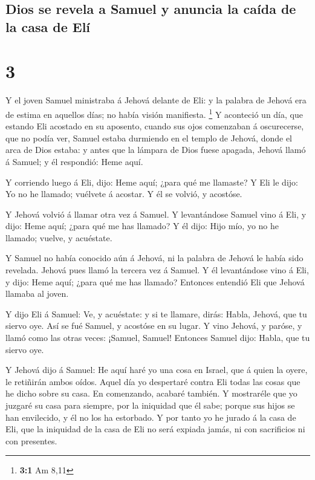 \hypertarget{dios-se-revela-a-samuel-y-anuncia-la-cauxedda-de-la-casa-de-eluxed}{%
\subsection{Dios se revela a Samuel y anuncia la caída de la casa de
Elí}\label{dios-se-revela-a-samuel-y-anuncia-la-cauxedda-de-la-casa-de-eluxed}}

\hypertarget{section-2}{%
\section{3}\label{section-2}}

 Y el joven Samuel ministraba á Jehová delante de Eli: y la
palabra de Jehová era de estima en aquellos días; no había visión
manifiesta. \footnote{\textbf{3:1} Am 8,11}  Y aconteció un
día, que estando Eli acostado en su aposento, cuando sus ojos comenzaban
á oscurecerse, que no podía ver,  Samuel estaba durmiendo en
el templo de Jehová, donde el arca de Dios estaba: y antes que la
lámpara de Dios fuese apagada,  Jehová llamó á Samuel; y él
respondió: Heme aquí.

 Y corriendo luego á Eli, dijo: Heme aquí; ¿para qué me
llamaste? Y Eli le dijo: Yo no he llamado; vuélvete á acostar. Y él se
volvió, y acostóse.

 Y Jehová volvió á llamar otra vez á Samuel. Y levantándose
Samuel vino á Eli, y dijo: Heme aquí; ¿para qué me has llamado? Y él
dijo: Hijo mío, yo no he llamado; vuelve, y acuéstate.

 Y Samuel no había conocido aún á Jehová, ni la palabra de
Jehová le había sido revelada.  Jehová pues llamó la tercera
vez á Samuel. Y él levantándose vino á Eli, y dijo: Heme aquí; ¿para qué
me has llamado? Entonces entendió Eli que Jehová llamaba al joven.

 Y dijo Eli á Samuel: Ve, y acuéstate: y si te llamare,
dirás: Habla, Jehová, que tu siervo oye. Así se fué Samuel, y acostóse
en su lugar.  Y vino Jehová, y paróse, y llamó como las
otras veces: ¡Samuel, Samuel! Entonces Samuel dijo: Habla, que tu siervo
oye.

 Y Jehová dijo á Samuel: He aquí haré yo una cosa en
Israel, que á quien la oyere, le retiñirán ambos oídos. 
Aquel día yo despertaré contra Eli todas las cosas que he dicho sobre su
casa. En comenzando, acabaré también.  Y mostraréle que yo
juzgaré su casa para siempre, por la iniquidad que él sabe; porque sus
hijos se han envilecido, y él no los ha estorbado.  Y por
tanto yo he jurado á la casa de Eli, que la iniquidad de la casa de Eli
no será expiada jamás, ni con sacrificios ni con presentes.


